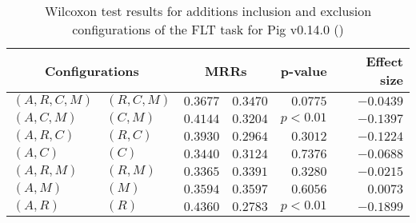 
\begin{table}
\begin{spacing}{1.2}
\centering
\caption{Wilcoxon test results for additions inclusion and exclusion configurations of the FLT task for Pig v0.14.0 (\ctwo)}
\label{table:versus-wilcox-pig-flt-additions}
\begin{tabular}{ll|rr|rr}
\toprule
      \multicolumn{2}{c|}{Configurations} &                \multicolumn{2}{c|}{MRRs} &             p-value & Effect size \\
\midrule
 $(A,R,C,M)$ &  $(R,C,M)$ &  $\bm{0.3677}$ &       $0.3470$ & $0.0775$ &   $-0.0439$ \\
   $(A,C,M)$ &    $(C,M)$ &  $\bm{0.4144}$ &       $0.3204$ & $p<0.01$ &   $-0.1397$ \\
   $(A,R,C)$ &    $(R,C)$ &  $\bm{0.3930}$ &       $0.2964$ & $0.3012$ &   $-0.1224$ \\
     $(A,C)$ &      $(C)$ &  $\bm{0.3440}$ &       $0.3124$ & $0.7376$ &   $-0.0688$ \\
   $(A,R,M)$ &    $(R,M)$ &       $0.3365$ &  $\bm{0.3391}$ & $0.3280$ &   $-0.0215$ \\
     $(A,M)$ &      $(M)$ &       $0.3594$ &  $\bm{0.3597}$ & $0.6056$ &    $0.0073$ \\
     $(A,R)$ &      $(R)$ &  $\bm{0.4360}$ &       $0.2783$ & $p<0.01$ &   $-0.1899$ \\
\bottomrule
\end{tabular}

\end{spacing}
\end{table}

